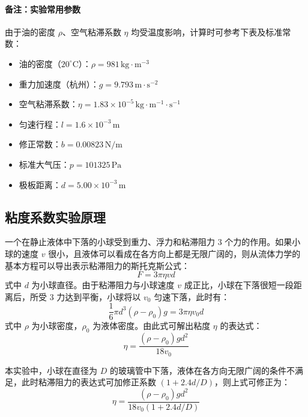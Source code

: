 \documentclass[11pt]{article}
\begin{document}
\paragraph{备注：实验常用参数}
由于油的密度 $\rho$、空气粘滞系数 $\eta$ 均受温度影响，计算时可参考下表及标准常数：

\begin{itemize}
    \item 油的密度（$20^\circ\text{C}$）：$\rho = 981 \, \text{kg} \cdot \text{m}^{-3}$
    \item 重力加速度（杭州）：$g = 9.793 \, \text{m} \cdot \text{s}^{-2}$
    \item 空气粘滞系数：$\eta = 1.83 \times 10^{-5} \, \text{kg} \cdot \text{m}^{-1} \cdot \text{s}^{-1}$
    \item 匀速行程：$l = 1.6 \times 10^{-3} \, \text{m}$
    \item 修正常数：$b = 0.00823 \, \text{N/m}$
    \item 标准大气压：$p = 101325 \, \text{Pa}$
    \item 极板距离：$d = 5.00 \times 10^{-3} \, \text{m}$
\end{itemize}

\subsection{粘度系数实验原理}

一个在静止液体中下落的小球受到重力、浮力和粘滞阻力 3 个力的作用。如果小球的速度 $v$ 很小，且液体可以看成在各方向上都是无限广阔的，则从流体力学的基本方程可以导出表示粘滞阻力的斯托克斯公式：
\begin{equation}
    F = 3\pi\eta vd
\end{equation}
式中 $d$ 为小球直径。由于粘滞阻力与小球速度 $v$ 成正比，小球在下落很短一段距离后，所受 3 力达到平衡，小球将以 $v_0$ 匀速下落，此时有：
\begin{equation}
    \frac{1}{6}\pi d^3 (\rho - \rho_0)g = 3\pi\eta v_0d
\end{equation}
式中 $\rho$ 为小球密度，$\rho_0$ 为液体密度。由此式可解出粘度 $\eta$ 的表达式：
\begin{equation}
    \eta = \frac{(\rho - \rho_0)gd^2}{18v_0}
\end{equation}

本实验中，小球在直径为 $D$ 的玻璃管中下落，液体在各方向无限广阔的条件不满足，此时粘滞阻力的表达式可加修正系数 $(1 + 2.4d/D)$，则上式可修正为：
\begin{equation}
    \eta = \frac{(\rho - \rho_0)gd^2}{18v_0(1 + 2.4d/D)}
\end{equation}
\end{document}
